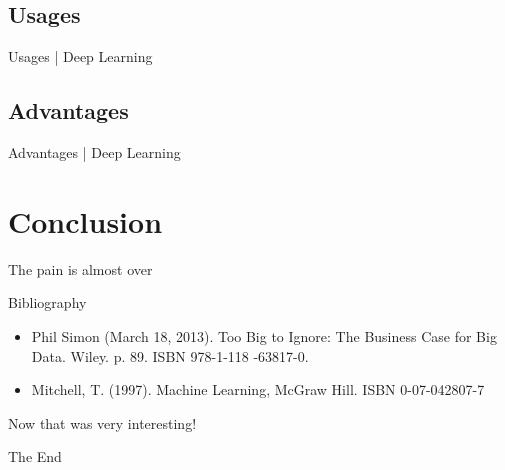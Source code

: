 \documentclass[10pt]{beamer}
\begin{document}
		\subsection{Usages}
			\begin{frame}{Usages | Deep Learning}
			\end{frame}
		\subsection{Advantages}
			\begin{frame}{Advantages | Deep Learning}
			\end{frame}
	
	
	
	\section{Conclusion}
		\begin{frame}{The pain is almost over}
		\end{frame}
		\begin{frame}{Bibliography}
			\twocolumn
			\begin{itemize}
				\item \scriptsize{Phil Simon (March 18, 2013). Too Big to Ignore: The Business Case for Big Data. Wiley. p. 89. ISBN 978-1-118
					-63817-0.}
				\item \scriptsize{Mitchell, T. (1997). Machine Learning, McGraw Hill. ISBN 0-07-042807-7}
			\end{itemize}
			\onecolumn
		\end{frame}
\endgroup

\begingroup
	\begin{frame}[plain,c]
		\hspace*{6 mm}
		\vspace*{-18 mm}
		\textcolor{blue_light}{\Large{Now that was very interesting!}}
	\end{frame}
	\begin{frame}[plain,c]
		\hspace*{27 mm}
		\vspace*{-20 mm}
		\textcolor{blue_light}{\Large{The End}}
	\end{frame}
\endgroup
\end{document}
